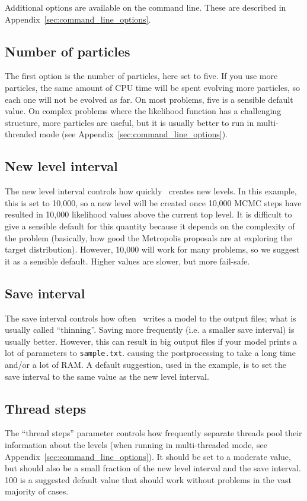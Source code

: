 \documentclass[article, nojss]{jss}
\newcommand{\dnest}{\pkg{DNest4}}
\begin{document}
Additional options are available on the command line. These are
described in Appendix~\ref{sec:command_line_options}.

\subsection{Number of particles}
The first option is the number of particles, here set to five.
If you use more particles, the same amount of CPU time will be spent evolving more particles,
so each one will not be evolved as far. On most problems, five is a sensible
default value. On complex problems where the likelihood function has
a challenging structure, more particles are useful, but it is usually better
to run in multi-threaded mode (see Appendix~\ref{sec:command_line_options}).

\subsection{New level interval}
The new level interval controls how quickly \dnest~creates new levels. In this
example, this is set to 10,000, so a new level will be created once 10,000
MCMC steps have resulted in
10,000 likelihood values above the current top level.
It is difficult to give a sensible default for this
quantity because it depends on the complexity of the problem (basically,
how good the Metropolis proposals are at exploring the target distribution).
However, 10,000 will work for many problems, so we suggest it as a sensible
default. Higher values are slower, but more fail-safe.

\subsection{Save interval}
The save interval controls how often \dnest~writes a model to the output
files; what is usually called ``thinning''. Saving more frequently
(i.e. a smaller save interval) is usually better. However, this can result
in
big output files if your model prints a lot of parameters to {\tt sample.txt}.
causing the postprocessing to take a long time and/or a lot of RAM.
A default suggestion, used in the example, is to set the save interval to the
same value as the new level interval.

\subsection{Thread steps}
The ``thread steps'' parameter controls how frequently separate threads pool
their information about the levels (when running in multi-threaded mode,
see Appendix~\ref{sec:command_line_options}). It should be set to a moderate
value, but should also be a small fraction of the new level interval and the
save interval. 100 is a suggested default value that should work without
problems in the vast majority of cases.
\end{document}
